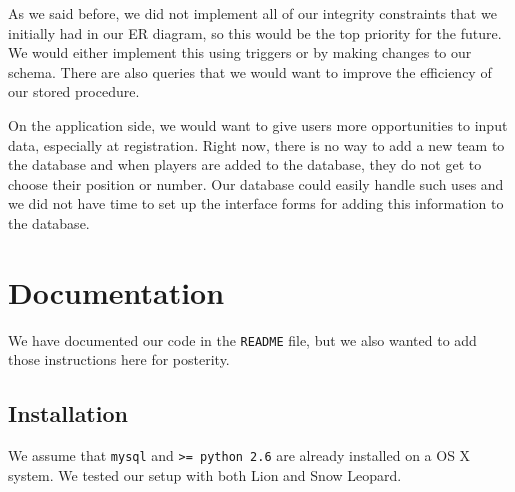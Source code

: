 \documentclass{article}
\begin{document}
As we said before, we did not implement all of our integrity constraints that we initially had in our ER diagram, so this would be the top priority for the future.  We would either implement this using triggers or by making changes to our schema.  There are also queries that we would want to improve the efficiency of our stored procedure. 

On the application side, we would want to give users more opportunities to input data, especially at registration.  Right now, there is no way to add a new team to the database and when players are added to the database, they do not get to choose their position or number.  Our database could easily handle such uses and we did not have time to set up the interface forms for adding this information to the database.


\section*{Documentation}

We have documented our code in the {\tt README} file, but we also wanted to add
those instructions here for posterity. 

\subsection*{Installation}

We assume that {\tt mysql} and {\tt >= python 2.6} are already installed on a 
OS X system. We tested our setup with both Lion and Snow Leopard. 
\end{document}
